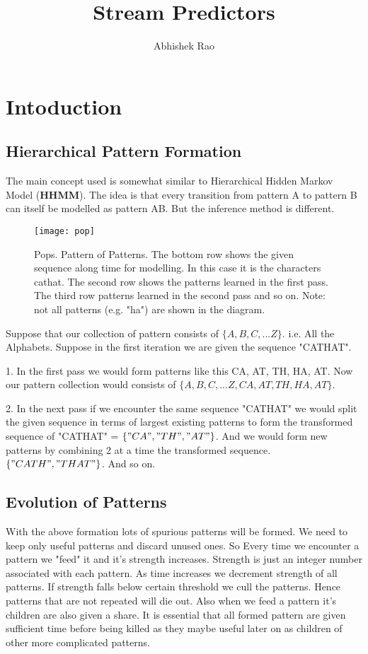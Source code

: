 \documentclass[fleqn,10pt]{olplainarticle}
\title{Stream Predictors}
\author[1]{Abhishek Rao}
\begin{document}
\flushbottom
\maketitle
\thispagestyle{empty}

\section*{Intoduction}
\subsection{Hierarchical Pattern Formation}
The main concept used is somewhat similar to Hierarchical Hidden Markov Model  (\textbf{HHMM}). The idea is that every transition from pattern A to pattern B can itself be modelled as pattern AB. But the inference method is different.

\begin{figure}[ht]
\centering
\texttt{[image: pop]}
\caption{Pops. Pattern of Patterns. The bottom row shows the given sequence along time for modelling. In this case it is the characters
cathat. The second row shows the patterns learned in the first pass. The third row patterns learned in the second pass and so on. Note: not all patterns (e.g. "ha") are shown in the diagram.}
\label{fig:view}
\end{figure}

Suppose that our collection of pattern consists of \(\{A,B,C,...Z\}\). i.e. All the Alphabets. Suppose in the first iteration we are given the sequence "CATHAT". 

1. In the first pass we would form patterns like this 
CA, AT, TH, HA, AT. Now our pattern collection would consists of  \(\{A,B,C,...Z, CA, AT, TH, HA, AT\}\).

2. In the next pass if we encounter the same sequence "CATHAT" we would split the given sequence in terms of largest existing patterns to form the transformed sequence of "CATHAT" = \(\{"CA", "TH", "AT"\}\). 
And we would form new patterns by combining 2 at a time the transformed sequence. \( \{ "CATH", "THAT"\}\). And so on. 

\subsection{ Evolution of Patterns}
With the above formation lots of spurious patterns will be formed. We need to keep only useful patterns and discard unused ones. So Every time we encounter a pattern we "feed" it and it's strength increases. Strength is just an integer number associated with each pattern. As time increases we decrement strength of all patterns. If strength falls below certain threshold we cull the patterns. Hence patterns that are not repeated will die out. Also when we feed a pattern it's children are also given a share. It is essential that all formed pattern are given sufficient time before being killed as they maybe useful later on as children of other more complicated patterns.
\end{document}
